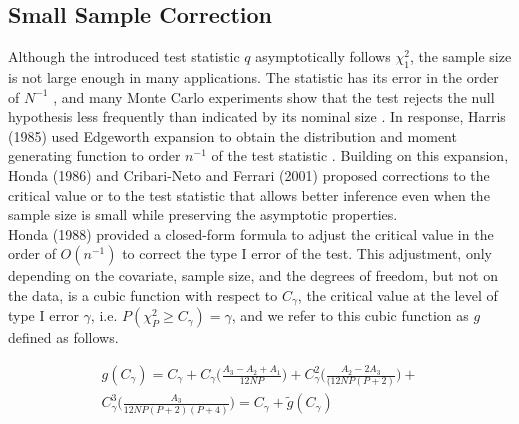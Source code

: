 \documentclass[aoas,preprint]{imsart}
\numberwithin{equation}{section}
\theoremstyle{plain}
\begin{document}


\pagebreak

\subsection{Small Sample Correction}
Although the introduced test statistic $q$ asymptotically follows $\chi_1^2$, the sample size is not large enough in many applications. The statistic has its error in the order of $N^{-1}$ \cite{harris1985asymptotic}, and many Monte Carlo experiments show that the test rejects the null hypothesis less frequently than indicated by its nominal size \cite{godfrey1978testing, griffiths1986monte, honda1988size} . In response, Harris (1985) used Edgeworth expansion to obtain the distribution and moment generating function to order $n^{-1}$ of the test statistic \cite{harris1985asymptotic}. Building on this expansion, Honda (1986) and Cribari-Neto and Ferrari (2001) proposed corrections to the critical value or to the test statistic that allows better inference even when the sample size is small while preserving the asymptotic properties. \cite{cribari1995improved, cribari2001monotonic, honda1988size}\\

Honda (1988) provided a closed-form formula to adjust the critical value in the order of $O(n^{-1})$ to correct the type I error of the test. This adjustment, only depending on the covariate, sample size, and the degrees of freedom, but not on the data, is a cubic function with respect to $C_{\gamma}$, the critical value at the level of type I error $\gamma$, i.e. $P(\chi_{P}^2 \geq C_{\gamma}) = \gamma$, and we refer to this cubic function as $g$ defined as follows.

\begin{equation}
    \begin{multlined}
g(C_{\gamma}) = C_{\gamma} + C_{\gamma}\bigg(\frac{A_3 - A_2 + A_1}{12NP}\bigg) + C_{\gamma}^2\bigg(\frac{A_2 - 2A_3}{(12NP(P+2)}\bigg) +\\
C_{\gamma}^3 \bigg(\frac{A_3}{12NP(P+2)(P+4)}\bigg) = C_{\gamma} + \tilde{g}(C_{\gamma})
\end{multlined}
\label{eq:hondacorrection}
\end{equation}
\end{document}
